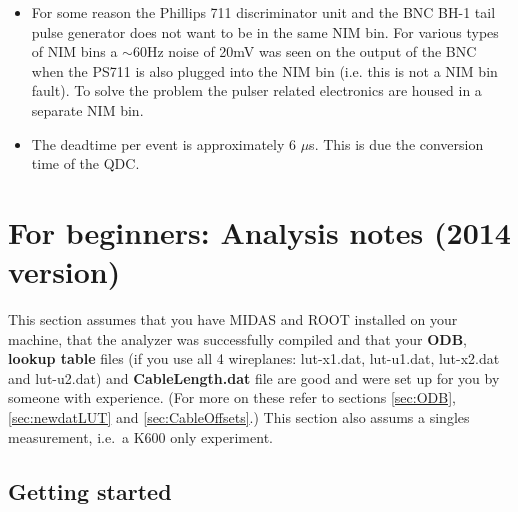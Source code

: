 \documentclass[11pt]{report}
\begin{document}
\begin{itemize}

\item For some reason the Phillips 711 discriminator unit and the BNC BH-1 tail pulse generator does
not want to be in the same NIM bin. %
%
%
For various types of NIM bins a $\sim$60Hz noise of 20mV was seen on the output of the BNC when the PS711 is also 
plugged into the NIM bin (i.e. this is not a NIM bin fault).  
To solve the problem the pulser related electronics are housed in a separate NIM bin.

\item The deadtime per event is  approximately 6 $\mu$s. This is due the conversion time of the QDC.

\end{itemize}




\section{For beginners: Analysis notes (2014 version)}\label{sec:analysisforbeginners}

This section assumes that you have MIDAS and ROOT installed on your machine, that the analyzer was 
successfully compiled and that your {\bf ODB}, {\bf lookup table} files 
(if you use all 4 wireplanes: lut-x1.dat, lut-u1.dat, lut-x2.dat and lut-u2.dat) and 
{\bf CableLength.dat} file are good and were set up for you by someone with experience.  
(For more on these refer to sections \ref{sec:ODB}, \ref{sec:newdatLUT} and \ref{sec:CableOffsets}.)
This section also assums a singles measurement, i.e.~a K600 only experiment.

\subsection{Getting started}
\end{document}

